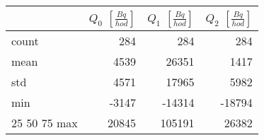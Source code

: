 \begin{tabular}{lrrr}
\toprule
{} &  $Q_0$ $\left[\si{\frac{Bq}{hod}}\right]$ &  $Q_1$ $\left[\si{\frac{Bq}{hod}}\right]$ &  $Q_2$ $\left[\si{\frac{Bq}{hod}}\right]$ \\
\midrule
count &                                       284 &                                       284 &                                       284 \\
mean  &                                      4539 &                                     26351 &                                      1417 \\
std   &                                      4571 &                                     17965 &                                      5982 \\
min   &                                     -3147 &                                    -14314 &                                    -18794 \\
25%
50%
75%
max   &                                     20845 &                                    105191 &                                     26382 \\
\bottomrule
\end{tabular}
